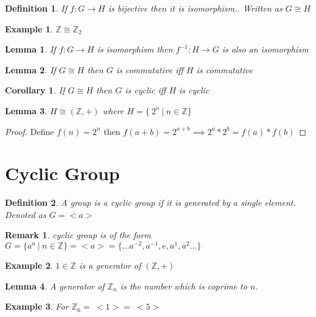 \documentclass[12pt,a4paper]{article}
\newcommand{\Z}{\mathbb{Z}}
\newtheorem*{defn}{Definition}
\newtheorem*{rem}{Remark}
\newtheorem*{lem}{Lemma}
\newtheorem*{cor}{Corollary}
\newtheorem{ex}{Example}
\begin{document}
\begin{defn}
\normalfont	If $f: G \to H$ is bijective then it is \textit{isomorphism.}. Written as $G \cong H$
\end{defn}
\begin{ex}
	$\Z \cong \Z_{2}$
\end{ex}
\begin{lem}
	\normalfont If $f: G \to H$ is isomorphism then $f^{-1}: H \to G$ is also an isomorphism
\end{lem}
\begin{lem}
	\normalfont If $G \cong H$ then $G$ is commutative iff $H$ is commutative
\end{lem}
\begin{cor}
	\normalfont If $G \cong H$ then $G$ is cyclic iff $H$ is cyclic
\end{cor}
\begin{lem}
	\normalfont $H \cong (\Z, +)$ where $H =  \{\ 2^n \: | \: n \in \Z \}$
\end{lem}
\begin{proof}
	Define $f(n) = 2^n$ then $f(a+b) = 2^{a+b} \implies 2^a * 2^b = f(a)*f(b)$
\end{proof}



\section{Cyclic Group}

\begin{defn}\normalfont
	A group is a \textit{cyclic group} if it is generated by a single element. Denoted as $G = <a>$
\end{defn}

\begin{rem}
	cyclic group is of the form $G=\{a^n \: |\: n\in \Z\} = <a> = \{\dots a^{-2},a^{-1},e,a^{1},a^{2}\dots \}$
\end{rem}

\begin{ex}
	$1 \in \Z$ is a generator of $(\Z, +)$
\end{ex}
\begin{lem}\normalfont
	A generator of $\Z_{n}$ is the number which is coprime to $n$.
\end{lem}
\begin{ex}
	For $\Z_{6} =\: <1> = \:<5>$
\end{ex}
\end{document}
